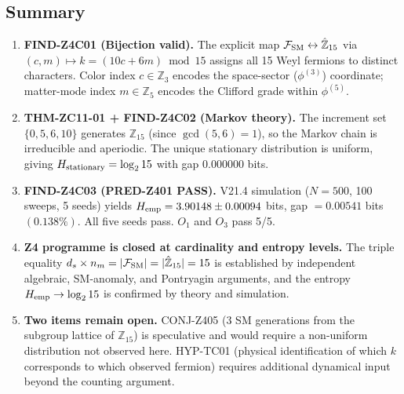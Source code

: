 \documentclass[12pt, a4paper]{article}
\begin{document}
\subsection{Summary}
\label{sec:summary}

\begin{enumerate}[leftmargin=*]

\item \textbf{FIND-Z4C01 (Bijection valid).}
  The explicit map $\mathcal{F}_{\rm SM} \leftrightarrow \hat{\mathbb{Z}}_{15}$
  via $(c,m) \mapsto k = (10c+6m)\bmod 15$ assigns all 15 Weyl fermions
  to distinct characters. Color index $c \in \mathbb{Z}_3$ encodes the
  space-sector ($\phi^{(3)}$) coordinate; matter-mode index $m \in
  \mathbb{Z}_5$ encodes the Clifford grade within $\phi^{(5)}$.

\item \textbf{THM-ZC11-01 + FIND-Z4C02 (Markov theory).}
  The increment set $\{0,5,6,10\}$ generates $\mathbb{Z}_{15}$
  (since $\gcd(5,6)=1$), so the Markov chain is irreducible and
  aperiodic. The unique stationary distribution is uniform, giving
  $H_{\rm stationary} = \log_2 15$ with gap $0.000000$ bits.

\item \textbf{FIND-Z4C03 (PRED-Z401 PASS).}
  V21.4 simulation ($N=500$, 100 sweeps, 5 seeds) yields
  $H_{\rm emp} = 3.90148 \pm 0.00094$ bits, gap $= 0.00541$ bits
  $(0.138\%)$. All five seeds pass. $O_1$ and $O_3$ pass 5/5.

\item \textbf{Z4 programme is closed at cardinality and entropy levels.}
  The triple equality
  $d_s \times n_m = |\mathcal{F}_{\rm SM}| = |\hat{\mathbb{Z}}_{15}| = 15$
  is established by independent algebraic, SM-anomaly, and Pontryagin
  arguments, and the entropy $H_{\rm emp} \to \log_2 15$ is confirmed
  by theory and simulation.

\item \textbf{Two items remain open.}
  CONJ-Z405 (3 SM generations from the subgroup lattice of
  $\mathbb{Z}_{15}$) is speculative and would require a non-uniform
  distribution not observed here. HYP-TC01 (physical identification
  of which $k$ corresponds to which observed fermion) requires
  additional dynamical input beyond the counting argument.

\end{enumerate}
\end{document}
